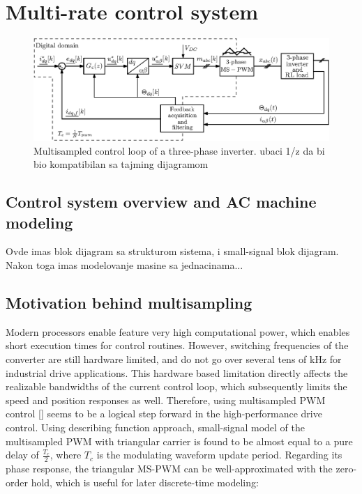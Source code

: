 \documentclass[journal]{IEEEtran}
\begin{document}
\section{Multi-rate control system}

\begin{figure}[t!]
    \centerline{\includegraphics[width=0.95\linewidth]{figures/schematic.eps}}
    \caption{Multisampled control loop of a three-phase inverter. ubaci 1/z da bi bio kompatibilan sa tajming dijagramom}
    \label{fig:MSControl}
\end{figure}

\subsection{Control system overview and AC machine modeling}
Ovde imas blok dijagram sa strukturom sistema, i small-signal blok dijagram. Nakon toga imas modelovanje masine sa jednacinama...


\subsection{Motivation behind multisampling}
Modern processors enable feature very high computational power, which enables short execution times for control routines. However, switching frequencies of the converter are still hardware limited, and do not go over several tens of kHz for industrial drive applications. This hardware based limitation directly affects the realizable bandwidths of the current control loop, which subsequently limits the speed and position responses as well. Therefore, using multisampled PWM control [] seems to be a logical step forward in the high-performance drive control. 
Using describing function approach, small-signal model of the multisampled PWM with triangular carrier is found to be almost equal to a pure delay of $\frac{T_c}{2}$, where $T_c$ is the modulating waveform update period. Regarding its phase response, the triangular MS-PWM can be well-approximated with the zero-order hold, which is useful for later discrete-time modeling: 
\end{document}
